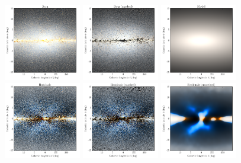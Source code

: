\documentclass[12pt, preprint]{aastex}
\begin{document}
\begin{figure}[h!]
\centering
\includegraphics[width=0.3\textwidth]{xbulge-fit-data}
\includegraphics[width=0.3\textwidth]{xbulge-fit-masked}
\includegraphics[width=0.3\textwidth]{xbulge-fit-model}
\\
\includegraphics[width=0.3\textwidth]{xbulge-fit-resid}
\includegraphics[width=0.3\textwidth]{xbulge-fit-residmasked}
\includegraphics[width=0.3\textwidth]{xbulge-fit-smooth2}

\end{figure}
\end{document}
